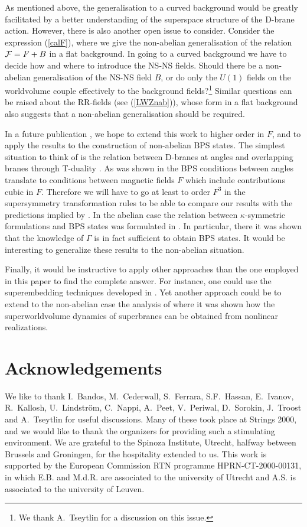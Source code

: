 \documentclass[12pt,a4paper]{article}
\begin{document}
As mentioned above, the generalisation to a curved background would be
greatly facilitated by a better understanding of the superspace
structure of the D-brane action. However, there is also another
open issue to consider. Consider
the expression (\ref{calF}), where we give the non-abelian
generalisation of the relation ${\cal F}=F+B$ in a flat
background. In going to a curved background we have to decide
how and where to introduce the NS-NS fields. Should there
be a non-abelian generalisation of the NS-NS field $B$, or
do only the $U(1)$ fields on the worldvolume
couple effectively to the background
fields?\footnote{We thank A.~Tseytlin for a discussion on this issue.}
 Similar questions can be raised about the RR-fields
(see (\ref{LWZnab})),
whose form in a flat background also suggests that a non-abelian
generalisation should be required.

In a future publication \cite{BRS2}, we hope to extend this work to
higher order in $F$, and to apply the results to the
construction of non-abelian BPS states. The simplest
situation to think of is the relation
between  D-branes at angles \cite{BDL} and  overlapping
branes through T-duality \cite{HT}. As was shown in
\cite{DST} the BPS conditions between angles translate to
conditions between magnetic fields $F$ which include
contributions cubic in $F$. Therefore we will have to go at least to
order $F^3$ in the supersymmetry transformation rules to
be able to compare our results with the predictions implied by
\cite{BDL}. In the abelian case the relation between
$\kappa$-symmetric formulations and BPS states was
formulated in \cite{BKOP}. In particular, there it was shown that
the knowledge of $\Gamma$ is in fact sufficient to obtain
BPS states. It would be interesting to generalize these results
to the non-abelian situation.


Finally, it would be instructive to apply other approaches than
the one employed in this paper to find the complete answer. For
instance, one could use the superembedding
techniques developed in \cite{Bandos:1995zw,Howe:1997wf}.
Yet another approach could be
to extend to the non-abelian case the analysis of \cite{Bellucci:2000bd}
where it was shown how the superworldvolume dynamics of 
superbranes can be obtained from nonlinear realizations.



\section*{Acknowledgements}
\noindent
We like to thank
I.~Bandos,
M.~Cederwall,
S.~Ferrara,
S.F.~Hassan,
E.~Ivanov,
R.~Kallosh,
U.~Lindstr\"om,
C.~Nappi,
A.~Peet,
V.~Periwal,
D.~Sorokin,
J.~Troost and
A.~Tseytlin
for useful discussions. Many of these took place at Strings 2000, and
we would like to thank the organizers for providing such a stimulating
environment.
We are grateful to the Spinoza Institute, Utrecht, halfway
between Brussels and Groningen, for the hospitality extended to us.
This work is supported by the European Commission
RTN programme HPRN-CT-2000-00131, in which E.B. and M.d.R. are associated
to the university of Utrecht and A.S. is associated to the university of
Leuven.
\end{document}
